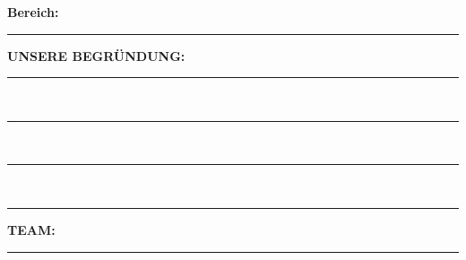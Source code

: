 \documentclass[12pt, a4paper]{article}
\begin{document}
\begin{center}
{\begin{minipage}{0.45\textwidth}
                \vspace{0.5cm}
                
                \textbf{Bereich:} \rule{0.7\linewidth}{0.4pt}
                
                \vspace{0.5cm}
                
                \textbf{UNSERE BEGRÜNDUNG:}\\
                \rule{\linewidth}{0.4pt}\\
                \rule{\linewidth}{0.4pt}\\
                \rule{\linewidth}{0.4pt}\\
                \rule{\linewidth}{0.4pt}
                
                \vspace{0.5cm}
                
                \textbf{TEAM:} \rule{0.8\linewidth}{0.4pt}
            \end{minipage}%
        }
    \end{center}
\end{document}
